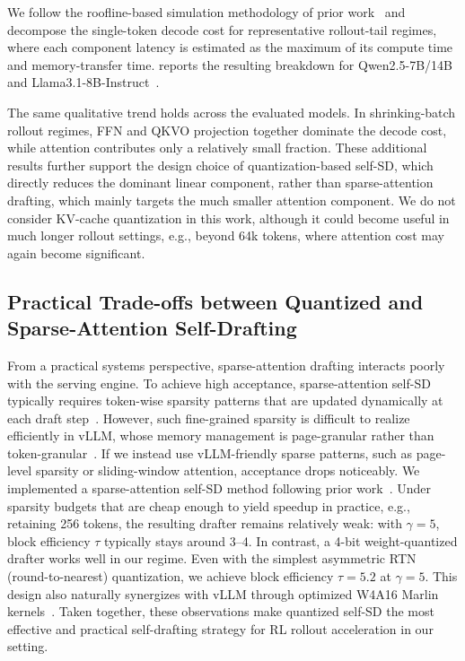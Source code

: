 \documentclass{llmxive}
\begin{document}
We follow the roofline-based simulation methodology of prior work~\cite{kim2025beyond} and decompose the single-token decode cost for representative rollout-tail regimes, where each component latency is estimated as the maximum of its compute time and memory-transfer time.
 reports the resulting breakdown for Qwen2.5-7B/14B~\cite{Yang2024Qwen25TR} and Llama3.1-8B-Instruct~\cite{grattafiori2024llama}.

The same qualitative trend holds across the evaluated models.
In shrinking-batch rollout regimes, FFN and QKVO projection together dominate the decode cost, while attention contributes only a relatively small fraction.
These additional results further support the design choice of quantization-based self-SD, which directly reduces the dominant linear component, rather than sparse-attention drafting, which mainly targets the much smaller attention component.
We do not consider KV-cache quantization in this work, although it could become useful in much longer rollout settings, e.g., beyond 64k tokens, where attention cost may again become significant.

\subsection{Practical Trade-offs between Quantized and Sparse-Attention Self-Drafting}
\label{app:practical_quantized_vs_sparse}

From a practical systems perspective, sparse-attention drafting interacts poorly with the serving engine.
To achieve high acceptance, sparse-attention self-SD typically requires token-wise sparsity patterns that are updated dynamically at each draft step~\cite{tang2024quest,yue2026specattn}.
However, such fine-grained sparsity is difficult to realize efficiently in vLLM, whose memory management is page-granular rather than token-granular~\cite{kwon2023efficient}.
If we instead use vLLM-friendly sparse patterns, such as page-level sparsity or sliding-window attention, acceptance drops noticeably.
We implemented a sparse-attention self-SD method following prior work~\cite{yue2026specattn}.
Under sparsity budgets that are cheap enough to yield speedup in practice, e.g., retaining 256 tokens, the resulting drafter remains relatively weak: with $\gamma=5$, block efficiency $\tau$ typically stays around 3--4.
In contrast, a 4-bit weight-quantized drafter works well in our regime.
Even with the simplest asymmetric RTN (round-to-nearest) quantization, we achieve block efficiency $\tau=5.2$ at $\gamma=5$.
This design also naturally synergizes with vLLM through optimized W4A16 Marlin kernels~\cite{frantar2025marlin}.
Taken together, these observations make quantized self-SD the most effective and practical self-drafting strategy for RL rollout acceleration in our setting.
\end{document}

